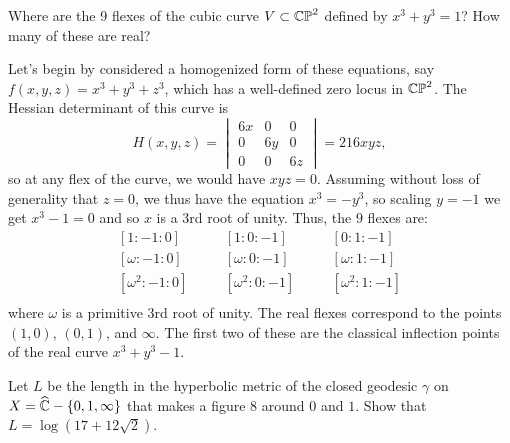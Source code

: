 \documentclass{pset}
\begin{document}
\begin{problem}{5.10}
  Where are the 9 flexes of the cubic curve $V\subset \mathbb{CP}^2$ defined by $x^3+y^3=1$? How many of these are real?
\end{problem}

\begin{solution}
  Let's begin by considered a homogenized form of these equations, say $f(x,y,z) = x^3+y^3+z^3$, which has a well-defined zero locus in $\mathbb{CP}^2$. The Hessian determinant of this curve is 
  \[
    H(x,y,z) = \begin{vmatrix} 6x & 0 & 0 \\ 0 & 6y & 0 \\ 0 & 0 & 6z\end{vmatrix} = 216xyz,
  \]
  so at any flex of the curve, we would have $xyz=0$. Assuming without loss of generality that $z=0$, we thus have the equation $x^3 = -y^3$, so scaling $y=-1$ we get $x^3-1=0$ and so $x$ is a 3rd root of unity. Thus, the $9$ flexes are:
  \[
  \begin{aligned}
    [1: -1: 0] &\quad &[1: 0: -1]&\quad &[0: 1: -1] \\
    [\omega: -1: 0] &\quad &[\omega: 0: -1]&\quad &[\omega: 1: -1] \\
    [\omega^2: -1: 0] &\quad &[\omega^2: 0: -1]&\quad &[\omega^2: 1: -1] \\
  \end{aligned}
  \]
  where $\omega$ is a primitive 3rd root of unity. The real flexes correspond to the points $(1,0)$, $(0,1)$, and $\infty$. The first two of these are the classical inflection points of the real curve $x^3 + y^3 -1$.
\end{solution}

\begin{problem}{5.26}
  Let $L$ be the length in the hyperbolic metric of the closed geodesic $\gamma$ on $X=\widehat{\mathbb{C}} - \{0,1,\infty\}$ that makes a figure $8$ around $0$ and $1$. Show that $L= \log(17+12\sqrt{2})$. %
\end{problem}
\end{document}
